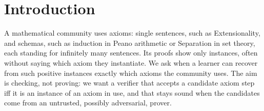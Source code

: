 \section{Introduction}\label{sec:intro}

A mathematical community uses axioms: single sentences, such as Extensionality, and schemas, such as induction in Peano
arithmetic or Separation in set theory, each standing for infinitely many sentences. Its proofs show only instances,
often without saying which axiom they instantiate. We ask when a learner can recover from such positive instances
exactly which axioms the community uses. The aim is checking, not proving: we want a verifier that accepts a candidate
axiom step iff it is an instance of an axiom in use, and that stays sound when the candidates come from an untrusted,
possibly adversarial, prover.

